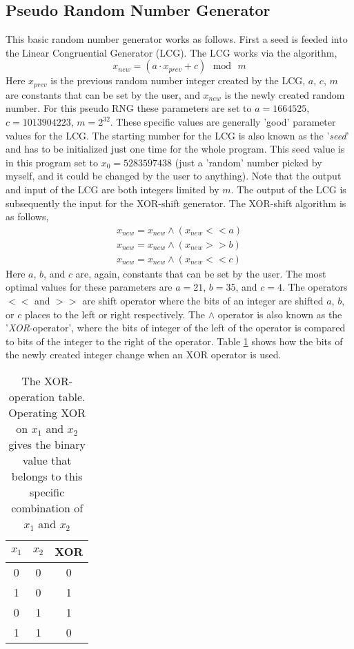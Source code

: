 \subsection{Pseudo Random Number Generator}

This basic random number generator works as follows. First a seed is feeded into the Linear Congruential Generator (LCG). The LCG works via the algorithm,
\begin{equation}
x_{new} = (a\cdot x_{prev} + c) \mathrm{ \ \ \ mod \ \ \ } m
\end{equation}
Here $x_{prev}$ is the previous random number integer created by the LCG, $a$, $c$, $m$ are constants that can be set by the user, and $x_{new}$ is the newly created random number. For this pseudo RNG these parameters are set to $a = 1664525$, $c = 1013904223$, $m = 2^{32}$. These specific values are generally 'good' parameter values for the LCG. The starting number for the LCG is also known as the '\textit{seed}' and has to be initialized just one time for the whole program. This seed value is in this program set to $x_0 = 5283597438$ (just a 'random' number picked by myself, and it could be changed by the user to anything). Note that the output and input of the LCG are both integers limited by $m$. The output of the LCG is subsequently the input for the XOR-shift generator. The XOR-shift algorithm is as follows,
\begin{gather}
x_{new}  = x_{new} \wedge (x_{new} << a) \\
x_{new} =  x_{new} \wedge (x_{new} >> b)\\
x_{new} =  x_{new} \wedge (x_{new} << c)
\end{gather} 
Here $a$, $b$, and $c$ are, again, constants that can be set by the user. The most optimal values for these parameters are $a =21$, $b=35$, and $c = 4$. The operators $<<$ and $>>$ are shift operator where the bits of an integer are shifted $a$, $b$, or $c$ places to the left or right respectively. The $\wedge$ operator is also known as the '\textit{XOR}-operator', where the bits of integer of the left of the operator is compared to bits of the integer to the right of the operator. Table \ref{XOR-table} shows how the bits of the newly created integer change when an XOR operator is used. 
\begin{table}[h]
\centering
\begin{tabular}{|c|c|c|}
\hline
$x_1$ & $x_2$ & XOR\\
\hline
0 & 0 & 0\\
1 & 0 & 1 \\
0 & 1 & 1 \\
1 & 1 & 0\\
\hline
\end{tabular}
\label{XOR-table}
\caption{The XOR-operation table. Operating XOR on $x_1$ and $x_2$ gives the binary value that belongs to this specific combination of $x_1$ and $x_2$}
\end{table}
